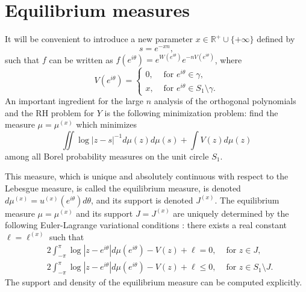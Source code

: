 \documentclass[11pt,fleqn]{article}
\numberwithin{equation}{section}
\begin{document}
\section{Equilibrium measures}\label{section: eq}

It will be convenient to introduce a new parameter $x \in \mathbb{R}^{+} \cup \{+\infty\}$ defined by
\begin{equation}\label{sx}
s = e^{-xn},
\end{equation}
such that $f$ can be written as $f(e^{i\theta}) = e^{W(e^{i\theta})}e^{-nV(e^{i\theta})}$, where 
\begin{equation}\label{V}
V(e^{i\theta}) = \begin{cases}
0, & \mbox{ for } e^{i\theta} \in \gamma, \\
x, & \mbox{ for } e^{i\theta} \in S_{1} \setminus \gamma.
\end{cases}
\end{equation}
An important ingredient for the large $n$ analysis of the orthogonal polynomials and the RH problem for $Y$ is the following minimization problem:
find the measure $\mu=\mu^{(x)}$ which minimizes 
\begin{equation} \label{inf_prob}
 \iint \log |z-s|^{-1} d\mu(z)d\mu(s) + \int V(z)d\mu(z)
\end{equation}
among all Borel probability measures on the unit circle $S_{1}$.



This measure, which is unique and absolutely continuous with respect to the Lebesgue measure, is called the equilibrium measure, is denoted $d\mu^{(x)}=u^{(x)}(e^{i\theta})d\theta$, and its support is denoted $J^{(x)}$.
The equilibrium measure $\mu=\mu^{(x)}$ and its support $J=J^{(x)}$ are uniquely determined by the following Euler-Lagrange variational conditions \cite{BDJ, SaTo}:
there exists a real constant $\ell=\ell^{(x)}$ such that
\begin{align}
&\label{EL_1}
2 \int_{-\pi}^{\pi} \log | z-e^{i\theta} | d\mu(e^{i\theta}) - V(z) + \ell = 0, &\mbox{ for } z \in J,\\&\label{EL_2}
2 \int_{-\pi}^{\pi} \log | z-e^{i\theta} | d\mu(e^{i\theta}) - V(z) + \ell \leq 0, &\mbox{ for } z \in S_{1}\setminus J.
\end{align}
The support and density of the equilibrium measure can be computed explicitly.
\end{document}
